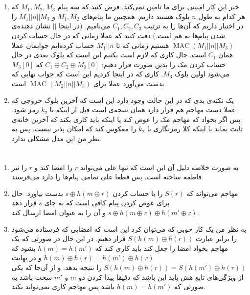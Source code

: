 \documentclass[]{article}
\begin{document}
\section{}
\begin{enumerate}
    \item خیر این کار امنیتی برای ما تامین نمی‌کند.
    فرض کنید که سه پیام
    $M_1, M_2, M_3$ که هر کدام به طول $n$ بلوک هستند داریم.
    همچنین ما
    پیام‌های
    $M_1, M_2$ و $M_1 || n || M_3$ را در اختیار داریم که آن‌ها را به ترتیب
    $C_1, C_2, C_3$ می‌نامیم.
    (در اینجا $||$ نشان دهنده‌ی  شدن پیام‌ها به هم است.)
    دقت کنید که عملا زمانی که در حال حساب کردن
    $\operatorname{MAC}(M_1 || n || M_3)$
    هستیم زمانی که تا
    $M_1 || n$
    حساب کرده‌ایم جوابمان عملا همان
    $C_1$
    است. حال کاری که لازم است بکنیم این است که بلوک بعدی در حال حساب کردن مک را بدین صورت قرار دهیم:
    $C_1 \oplus C_2 \oplus M_3[0]$ که $M_3[0]$
    می‌شود اولین بلوک
    $M_3$.
    کاری که در اینجا کردیم این است که جواب نهایی که
    بدست می‌آورد عملا برای
    $\operatorname{MAC}(M_2 || n || M_3)$
    است.

     
    \item یک نکته‌ی بدی که در این حالت وجود دارد این است که آخرین بلوک خروجی
    که عملا دست مهاجم هم قرار دارد همان نتیجه‌ی
    است قبل از اینکه با
    $k_2$
    رمز شود. پس اگر بخواد که مهاجم مک را عوض کند یا اینکه باید کاری بکند که آخرین خانه‌ی
    ثابت بماند یا اینکه کلا رمزنگاری با
    $k_2$
    را معکوس کند که امکان پذیر نیست. پس به نظر من این مدل مشکلی ندارد.
\end{enumerate}
\section{}
\begin{enumerate}
    \item به صورت خلاصه دلیل آن این است که تنها علی می‌تواند
    $r$
    را امضا کند و
    $r$
    را نیز فاطمه ساخته است. پس قطعا علی تمامی پیام‌ها را دارد می‌فرستد.
    \item مهاجم می‌تواند که
    $S(r)$
    را با حساب کردن
    $s \oplus h(m \oplus r)$
    بدست بیاورد. حال برای عوض کردن پیام کافی است که
    به جای
    $s$
    قرار دهد
    $s \oplus h(m \oplus r) \oplus h(m' \oplus r)$
    و آن را به عنوان امضا ارسال کند.
    \item به نظر من یک کار خوبی که می‌توان کرد این است که امضایی که فرستاده می‌شود را برابر عبارت
    $S(h(m) \oplus h(r))$
    قرار دهیم. در این حال در صورتی که یک مهاجم بخواد امضا را جعل کند باید کاری کند که
    $h(m) = h(m')$
    بشود که
    $h(m) \oplus h(r) = h(m') \oplus h(r)$ و در نهایت $S(h(m) \oplus h(r)) = S(h(m') \oplus h(r))$
    را نتیجه بدهد. و از آن‌جا که یکی از ویژگی‌های تابع هش باید این باشد که دقیقا پیدا کردن دو
    $m$ و $m'$
    سخت باشد به صورتی که
    $h(m) = h(m')$
    باشد پس مهاجم کاری نمی‌تواند بکند.
\end{enumerate}
\end{document}
